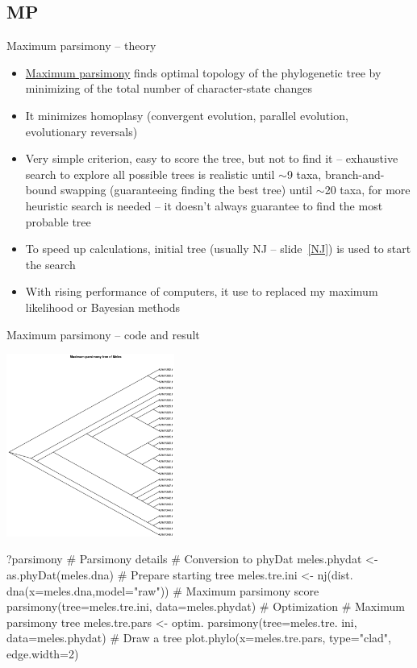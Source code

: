 \documentclass[compress, ucs, xelatex, 11pt, xcolor=svgnames,
  hyperref={
    bookmarks=true,
    unicode=true,
    colorlinks=true,
    pdftitle={Molecular data in R},
    plainpages=false,
    pdfauthor={Vojtech Zeisek},
    pdfsubject={Course about phylogeny and evolution in R},
    pdfcreator={XeLaTeX},
    pdfkeywords={R, evolution, phylogeny, molecular data},
    linkcolor=Tomato,
    anchorcolor=SaddleBrown,
    citecolor=Goldenrod,
    filecolor=DarkMagenta,
    menucolor=Sienna,
    urlcolor=DarkTurquoise,
    pdftex},
  url={hyphens, lowtilde} %
  ]{beamer}
\begin{document}
\subsection{MP}

\begin{frame}{Maximum parsimony -- theory}
  \label{MP}
  \begin{itemize}
    \item \href{https://en.wikipedia.org/wiki/Maximum_parsimony_(phylogenetics)}{Maximum parsimony} finds optimal topology of the phylogenetic tree by minimizing of the total number of character-state changes
    \item It minimizes homoplasy (convergent evolution, parallel evolution, evolutionary reversals)
    \item Very simple criterion, easy to score the tree, but not to find it -- exhaustive search to explore all possible trees is realistic until $\sim$9 taxa, branch-and-bound swapping (guaranteeing finding the best tree) until $\sim$20 taxa, for more heuristic search is needed -- it doesn't always guarantee to find the most probable tree
    \item To speed up calculations, initial tree (usually NJ -- slide~\ref{NJ}) is used to start the search
    \item With rising performance of computers, it use to replaced my maximum likelihood or Bayesian methods
  \end{itemize}
\end{frame}

\begin{frame}[fragile]{Maximum parsimony -- code and result}
\begin{multicols}{2}
  \vfil
  \includegraphics[height=6cm]{parsimony.png}
  \vfil
  \begin{spluscode}
    ?parsimony # Parsimony details
    # Conversion to phyDat
    meles.phydat <-
      as.phyDat(meles.dna)
    # Prepare starting tree
    meles.tre.ini <- nj(dist.
      dna(x=meles.dna,model="raw"))
    # Maximum parsimony score
    parsimony(tree=meles.tre.ini,
      data=meles.phydat)
    # Optimization
    # Maximum parsimony tree
    meles.tre.pars <- optim.
      parsimony(tree=meles.tre.
      ini, data=meles.phydat)
    # Draw a tree
    plot.phylo(x=meles.tre.pars,
      type="clad", edge.width=2)
  \end{spluscode}
\end{multicols}
\end{frame}
\end{document}

